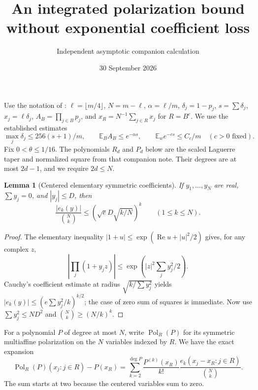 \documentclass[11pt]{article}
\title{An integrated polarization bound without exponential coefficient loss}
\author{Independent asymptotic companion calculation}
\date{30 September 2026}
\newtheorem{lemma}{Lemma}
\newcommand{\E}{\mathbb E}
\begin{document}
\maketitle
Use the notation of :
$\ell=\lfloor m/4\rfloor$, $N=m-\ell$, $\alpha=\ell/m$,
$\delta_j=1-p_j$, $s=\sum\delta_j$, $x_j=\ell\delta_j$,
$A_B=\prod_{j\in B}p_j$, and $x_R=N^{-1}\sum_{j\in R}x_j$ for
$R=B^c$. We use the established estimates
\[
 \max_j\delta_j\le256(s+1)/m,\qquad
 \E_B A_B\le e^{-\alpha s},\qquad
 \E_w e^{-cs}\le C_c/m \quad(c>0\text{ fixed}).        \tag{1}
\]
Fix $0<\theta\le1/16$. The polynomials $R_d$ and $P_d$ below are the
scaled Laguerre taper and normalized square from that companion note.
Their degrees are at most $2d-1$, and we require $2d\le N$.

\begin{lemma}[Centered elementary symmetric coefficients]
If $y_1,\ldots,y_N$ are real, $\sum y_j=0$, and $|y_j|\le D$, then
\[
 \frac{|e_k(y)|}{\binom Nk}
 \le\left(\sqrt e D\sqrt{k/N}\right)^k
 \qquad(1\le k\le N).
\tag{2}
\]
\end{lemma}
\begin{proof}
The elementary inequality
$|1+u|\le\exp(\operatorname{Re}u+|u|^2/2)$ gives, for any complex $z$,
\[
 \left|\prod_j(1+y_jz)\right|
 \le\exp\left(|z|^2\sum_jy_j^2/2\right).
\]
Cauchy's coefficient estimate at radius
$\sqrt{k/\sum y_j^2}$ yields
$|e_k(y)|\le(e\sum y_j^2/k)^{k/2}$; the case of zero sum of squares
is immediate. Now use $\sum y_j^2\le ND^2$ and
$\binom Nk\ge(N/k)^k$.
\end{proof}

For a polynomial $P$ of degree at most $N$, write $\operatorname{Pol}_R(P)$
for its symmetric multiaffine polarization on the $N$ variables indexed
by $R$. We have the exact expansion
\[
 \operatorname{Pol}_R(P)(x_j:j\in R)-P(x_R)
 =\sum_{k=2}^{\deg P}\frac{P^{(k)}(x_R)}{k!}
       \frac{e_k(x_j-x_R:j\in R)}{\binom Nk}.
\tag{3}
\]
The sum starts at two because the centered variables sum to zero.
\end{document}
